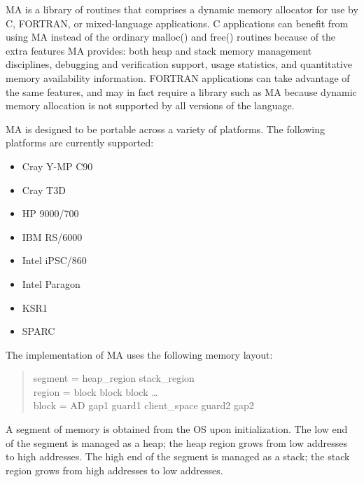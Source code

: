 
\setlength{\topmargin}{0in}
\setlength{\headheight}{0in}
\setlength{\headsep}{0in}
\setlength{\topskip}{0in}
\setlength{\textheight}{8.5in}
\setlength{\footheight}{10pt}
\setlength{\footskip}{0.5in}

\setlength{\textwidth}{6.5in}
\setlength{\oddsidemargin}{0in}
\setlength{\evensidemargin}{0in}
\setlength{\marginparwidth}{0in}
\setlength{\parindent}{0in}



MA is a library of routines that comprises a dynamic memory allocator
for use by C, FORTRAN, or mixed-language applications.  C applications
can benefit from using MA instead of the ordinary malloc() and free()
routines because of the extra features MA provides:  both heap and
stack memory management disciplines, debugging and verification
support, usage statistics, and quantitative memory availability
information.  FORTRAN applications can take advantage of the same
features, and may in fact require a library such as MA because dynamic
memory allocation is not supported by all versions of the language.

MA is designed to be portable across a variety of platforms.
The following platforms are currently supported:

\begin{itemize}
\item Cray Y-MP C90
\item Cray T3D
\item HP 9000/700
\item IBM RS/6000
\item Intel iPSC/860
\item Intel Paragon
\item KSR1
\item SPARC
\end{itemize}

The implementation of MA uses the following memory layout:

\begin{quote}
segment = heap\_region stack\_region \\
region = block block block \ldots \\
block = AD gap1 guard1 client\_space guard2 gap2
\end{quote}

A segment of memory is obtained from the OS upon initialization.
The low end of the segment is managed as a heap; the heap region
grows from low addresses to high addresses.  The high end of the
segment is managed as a stack; the stack region grows from high
addresses to low addresses.

